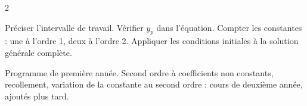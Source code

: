 \documentclass[a4paper,10pt]{article}
\begin{document}
\begin{multicols}{2}
\begin{REFL}
Préciser l'intervalle de travail. Vérifier $y_p$ dans l'équation. Compter les constantes : une à l'ordre 1, deux à l'ordre 2.
Appliquer les conditions initiales à la solution générale complète.
\end{REFL}

\begin{HPBOX}
Programme de première année. Second ordre à coefficients non constants, recollement, variation de la constante au second
ordre : cours de deuxième année, ajoutés plus tard.
\end{HPBOX}

\fi
\end{multicols}
\end{document}
